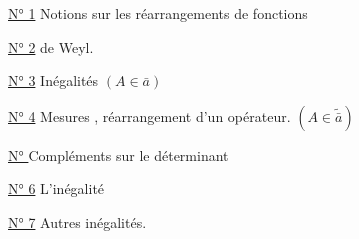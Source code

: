 \uline{N° 1} Notions sur les réarrangements de fonctions

\uline{N° 2}  de Weyl.

\uline{N° 3} Inégalités 
\((A\in\bar a)\)

\uline{N° 4} Mesures , réarrangement  d'un opérateur. \((A\in\widetilde{\bar a})\)


\uline{N° } Compléments sur le déterminant

\uline{N° 6} L'inégalité 

\uline{N° 7} Autres inégalités.

